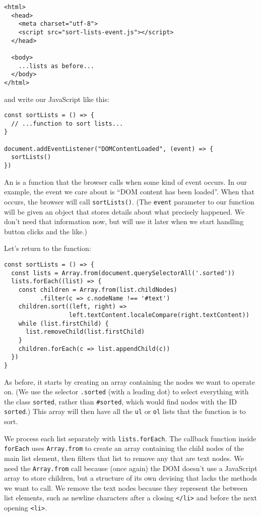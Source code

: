\begin{verbatim}
<html>
  <head>
    <meta charset="utf-8">
    <script src="sort-lists-event.js"></script>
  </head>

  <body>
    ...lists as before...
  </body>
</html>
\end{verbatim}

\noindent
and write our JavaScript like this:

\begin{verbatim}
const sortLists = () => {
  // ...function to sort lists...
}

document.addEventListener("DOMContentLoaded", (event) => {
  sortLists()
})
\end{verbatim}

An  is a function that the browser calls
when some kind of event occurs.
In our example,
the event we care about is ``DOM content has been loaded''.
When that occurs,
the browser will call \texttt{sortLists()}.
(The \texttt{event} parameter to our function will be given an object
that stores details about what precisely happened.
We don't need that information now,
but will use it later when we start handling button clicks and the like.)

Let's return to the function:

\begin{verbatim}
const sortLists = () => {
  const lists = Array.from(document.querySelectorAll('.sorted'))
  lists.forEach((list) => {
    const children = Array.from(list.childNodes)
          .filter(c => c.nodeName !== '#text')
    children.sort((left, right) =>
                  left.textContent.localeCompare(right.textContent))
    while (list.firstChild) {
      list.removeChild(list.firstChild)
    }
    children.forEach(c => list.appendChild(c))
  })
}
\end{verbatim}


As before,
it starts by creating an array containing the nodes we want to operate on.
(We use the selector \texttt{.sorted} (with a leading dot) to select everything with the class \texttt{sorted},
rather than \texttt{\#sorted},
which would find nodes with the ID \texttt{sorted}.)
This array will then have all the \texttt{ul} or \texttt{ol} lists that the function is to sort.

We process each list separately with \texttt{lists.forEach}.
The callback function inside \texttt{forEach}
uses \texttt{Array.from} to create an array containing the child nodes of the main list element,
then filters that list to remove any that are text nodes.
We need the \texttt{Array.from} call because (once again) the DOM doesn't use a JavaScript array to store children,
but a structure of its own devising that lacks the methods we want to call.
We remove the text nodes because they represent the  between list elements,
such as newline characters after a closing \texttt{{\textless}/li{\textgreater}}
and before the next opening \texttt{{\textless}li{\textgreater}}.

